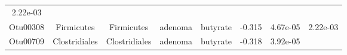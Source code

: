 \documentclass[11pt,]{article}
\begin{document}
\begin{longtable}[]{@{}cccccccc@{}}
\begin{minipage}[t]{0.08\columnwidth}
2.22e-03\strut
\end{minipage}\tabularnewline
\begin{minipage}[t]{0.08\columnwidth}\centering\strut
Otu00308\strut
\end{minipage} & \begin{minipage}[t]{0.15\columnwidth}\centering\strut
Firmicutes\strut
\end{minipage} & \begin{minipage}[t]{0.15\columnwidth}\centering\strut
Firmicutes\strut
\end{minipage} & \begin{minipage}[t]{0.08\columnwidth}\centering\strut
adenoma\strut
\end{minipage} & \begin{minipage}[t]{0.09\columnwidth}\centering\strut
butyrate\strut
\end{minipage} & \begin{minipage}[t]{0.07\columnwidth}\centering\strut
-0.315\strut
\end{minipage} & \begin{minipage}[t]{0.08\columnwidth}\centering\strut
4.67e-05\strut
\end{minipage} & \begin{minipage}[t]{0.08\columnwidth}\centering\strut
2.22e-03\strut
\end{minipage}\tabularnewline
\begin{minipage}[t]{0.08\columnwidth}\centering\strut
Otu00709\strut
\end{minipage} & \begin{minipage}[t]{0.15\columnwidth}\centering\strut
Clostridiales\strut
\end{minipage} & \begin{minipage}[t]{0.15\columnwidth}\centering\strut
Clostridiales\strut
\end{minipage} & \begin{minipage}[t]{0.08\columnwidth}\centering\strut
adenoma\strut
\end{minipage} & \begin{minipage}[t]{0.09\columnwidth}\centering\strut
butyrate\strut
\end{minipage} & \begin{minipage}[t]{0.07\columnwidth}\centering\strut
-0.318\strut
\end{minipage} & \begin{minipage}[t]{0.08\columnwidth}\centering\strut
3.92e-05\strut
\end{minipage} & \begin{minipage}[t]{0.08\columnwidth}\centering\strut

\end{minipage}
\end{longtable}
\end{document}
